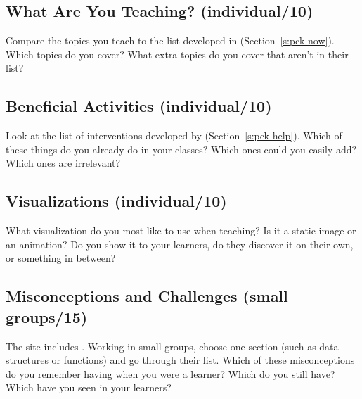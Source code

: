 \subsection*{What Are You Teaching? (individual/10)}

Compare the topics you teach to the list developed in \cite{Luxt2017}
(Section~\ref{s:pck-now}). Which topics do you cover? What extra topics
do you cover that aren't in their list?

\subsection*{Beneficial Activities (individual/10)}

Look at the list of interventions developed by \cite{Viha2014}
(Section~\ref{s:pck-help}). Which of these things do you already do in
your classes? Which ones could you easily add? Which ones are
irrelevant?

\subsection*{Visualizations (individual/10)}

What visualization do you most like to use when teaching? Is it a static
image or an animation? Do you show it to your learners, do they discover
it on their own, or something in between?

\subsection*{Misconceptions and Challenges (small groups/15)}

The  site
includes . Working in small groups, choose one
section (such as data structures or functions) and go through their
list. Which of these misconceptions do you remember having when you
were a learner? Which do you still have? Which have you seen in your
learners?
